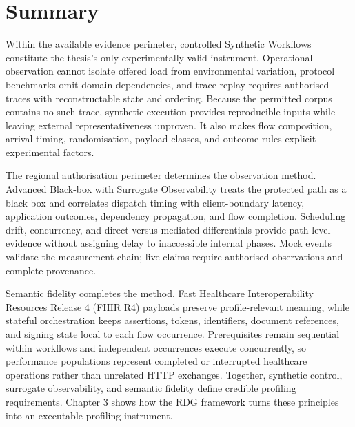 \section{Summary}
\noindent Within the available evidence perimeter, controlled Synthetic Workflows
constitute the thesis's only experimentally valid instrument. Operational
observation cannot isolate offered load from environmental variation, protocol
benchmarks omit domain dependencies, and trace replay requires authorised traces
with reconstructable state and ordering. Because the permitted corpus contains
no such trace, synthetic execution provides reproducible inputs while leaving
external representativeness unproven. It also makes flow composition, arrival
timing, randomisation, payload classes, and outcome rules explicit experimental
factors.

\noindent The regional authorisation perimeter determines the observation method. Advanced
Black-box with Surrogate Observability treats the protected path as a black box
and correlates dispatch timing with client-boundary latency, application
outcomes, dependency propagation, and flow completion. Scheduling drift,
concurrency, and direct-versus-mediated differentials provide path-level evidence
without assigning delay to inaccessible internal phases. Mock events validate
the measurement chain; live claims require authorised observations and complete
provenance.

\noindent Semantic fidelity completes the method. Fast Healthcare Interoperability
Resources Release 4 (FHIR R4) payloads preserve profile-relevant meaning, while
stateful orchestration keeps assertions, tokens, identifiers, document
references, and signing state local to each flow occurrence. Prerequisites remain
sequential within workflows and independent occurrences execute concurrently, so
performance populations represent completed or interrupted healthcare operations
rather than unrelated HTTP exchanges. Together, synthetic control, surrogate
observability, and semantic fidelity define credible profiling requirements.
Chapter 3 shows how the RDG framework turns these principles into an
executable profiling instrument.

\newpage
